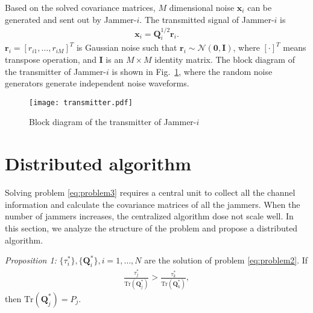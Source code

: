 \documentclass[12pt, journal,onecolumn,draftclsnofoot]{IEEEtran}
\begin{document}
Based on the solved covariance matrices,  $M$ dimensional noise $\mathbf{x}_i$ can be generated and sent out by Jammer-$i$. The transmitted signal of Jammer-$i$ is 
\begin{eqnarray}
\mathbf{x}_i = \mathbf{Q}_i^{1/2}\mathbf{r}_i.
\end{eqnarray} 
$\mathbf{r}_i = [r_{i1},\ldots,r_{iM}]^T$ is Gaussian noise such that $\mathbf{r}_i \sim \mathcal{N}(\mathbf{0},\mathbf{I})$, where $[\cdot]^T$ means transpose operation, and $\mathbf{I}$ is an $M \times M$ identity matrix. 
The block diagram of the transmitter of Jammer-$i$ is shown in Fig.~\ref{fig:transmitter}, where the random noise generators generate independent noise waveforms.
\begin{figure}[h]
	\centering
	\texttt{[image: transmitter.pdf]} %
	\caption{Block diagram of the transmitter of Jammer-$i$}
	\label{fig:transmitter}
\end{figure}

\section{Distributed algorithm} \label{sec:distributed algorithm}
Solving problem \eqref{eq:problem3} requires a central unit to collect all the channel information and calculate the covariance matrices of all the jammers. When the number of jammers increases, the centralized algorithm dose not scale well. In this section, we analyze the structure of the problem and propose a distributed algorithm. 

\emph{Proposition 1:} $\{\tau_i^*\}, \{\mathbf{Q}_i^*\}, i = 1, \ldots, N$ are the solution of problem \eqref{eq:problem2}. If 
\begin{eqnarray}
\frac{\tau_j^*}{\mathrm{Tr}(\mathbf{Q}_j^*)} > \frac{\tau_k^*}{\mathrm{Tr}(\mathbf{Q}_k^*)} \label{eq:efficiency},
\end{eqnarray}
then $\mathrm{Tr}(\mathbf{Q}_j^*) = P_j$.
\end{document}
